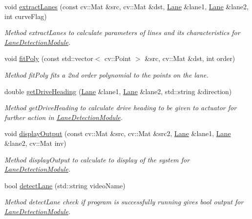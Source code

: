\begin{DoxyCompactItemize}
void \hyperlink{classLaneDetectionModule_aac3d46f14bbdbdea78991e84beff383e}{extract\+Lanes} (const cv\+::\+Mat \&src, cv\+::\+Mat \&dst, \hyperlink{classLane}{Lane} \&lane1, \hyperlink{classLane}{Lane} \&lane2, int curve\+Flag)
\begin{DoxyCompactList}\small\item\em Method extract\+Lanes to calculate parameters of lines and its characteristics for \hyperlink{classLaneDetectionModule}{Lane\+Detection\+Module}. \end{DoxyCompactList}\item 
void \hyperlink{classLaneDetectionModule_a9b982428acc3a1e83503c6e079ae3a50}{fit\+Poly} (const std\+::vector$<$ cv\+::\+Point $>$ \&src, cv\+::\+Mat \&dst, int order)
\begin{DoxyCompactList}\small\item\em Method fit\+Poly fits a 2nd order polynomial to the points on the lane. \end{DoxyCompactList}\item 
double \hyperlink{classLaneDetectionModule_a5a3cfd88512d1ce1e5dc55aed8d47e5f}{get\+Drive\+Heading} (\hyperlink{classLane}{Lane} \&lane1, \hyperlink{classLane}{Lane} \&lane2, std\+::string \&direction)
\begin{DoxyCompactList}\small\item\em Method get\+Drive\+Heading to calculate drive heading to be given to actuator for further action in \hyperlink{classLaneDetectionModule}{Lane\+Detection\+Module}. \end{DoxyCompactList}\item 
void \hyperlink{classLaneDetectionModule_a486a1a228a0b9a2556ff3f102da7d938}{display\+Output} (const cv\+::\+Mat \&src, cv\+::\+Mat \&src2, \hyperlink{classLane}{Lane} \&lane1, \hyperlink{classLane}{Lane} \&lane2, cv\+::\+Mat inv)
\begin{DoxyCompactList}\small\item\em Method display\+Output to calculate to display of the system for \hyperlink{classLaneDetectionModule}{Lane\+Detection\+Module}. \end{DoxyCompactList}\item 
bool \hyperlink{classLaneDetectionModule_a7b98ab6e8187993381f2c69b03ca76ef}{detect\+Lane} (std\+::string video\+Name)
\begin{DoxyCompactList}\small\item\em Method detect\+Lane check if program is successfully running gives bool output for \hyperlink{classLaneDetectionModule}{Lane\+Detection\+Module}. \end{DoxyCompactList}\item 

\end{DoxyCompactItemize}
